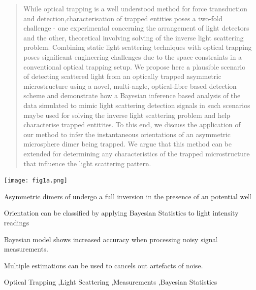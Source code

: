 \documentclass[final,3p, twocolumn]{elsarticle}
\begin{document}
\begin{frontmatter}
\begin{abstract}
While optical trapping is a well understood method for force transduction and detection,characterisation of trapped entities poses a two-fold challenge - one experimental concerning the arrangement of light detectors and the other, theoretical involving solving of the inverse light scattering problem. Combining static light scattering techniques with optical trapping poses significant engineering challenges due to the space constraints in a conventional optical trapping setup. We propose here a plausible scenario of detecting scattered light from an optically trapped asymmetric microstructure using a novel, multi-angle, optical-fibre based detection scheme and demonstrate how a Bayesian inference based analysis of the data simulated to mimic light scattering detection signals in such scenarios maybe used for solving the inverse light scattering problem and help characterise trapped entitites. To this end, we discuss the application of our method to infer the instantaneous orientations of an asymmetric microsphere dimer being trapped. We argue that this method can be extended for determining any characteristics of the trapped microstructure that influence the light scattering pattern. 

\end{abstract}

\begin{graphicalabstract}
	\centering
	\texttt{[image: fig1a.png]}
\end{graphicalabstract}

\begin{highlights}
\item Asymmetric dimers of undergo a full inversion in the presence of an potential well
\item Orientation can be classified by applying Bayesian Statistics to light intensity readings
\item Bayesian model shows increased accuracy when processing noisy signal measurements. 
\item Multiple estimations can be  used to cancels out artefacts of noise. 
\end{highlights}

\begin{keyword}
	Optical Trapping \sep Light Scattering \sep Measurements \sep Bayesian Statistics

\end{keyword}

\end{frontmatter}
\end{document}
